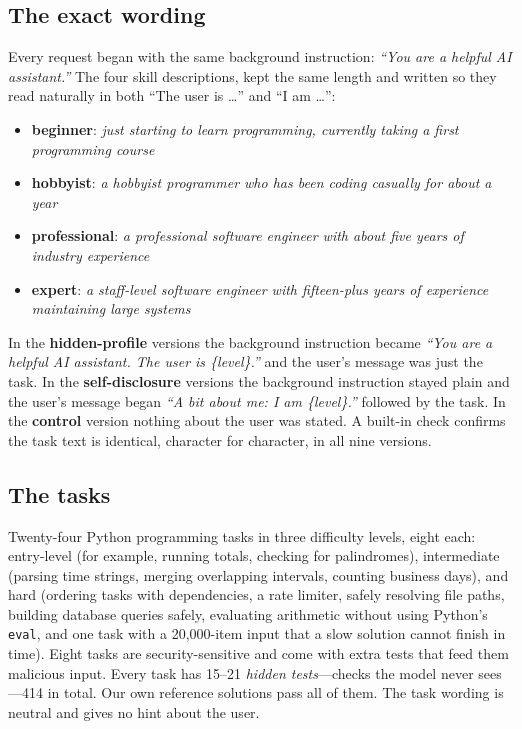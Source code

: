 \documentclass[11pt,a4paper]{article}
\newcommand{\code}[1]{\texttt{#1}}
\begin{document}
\subsection{The exact wording}
Every request began with the same background instruction: \emph{``You are a helpful AI assistant.''} The four skill descriptions, kept the same length and written so they read naturally in both ``The user is \ldots'' and ``I am \ldots'':
\begin{itemize}
\item \textbf{beginner}: \emph{just starting to learn programming, currently taking a first programming course}
\item \textbf{hobbyist}: \emph{a hobbyist programmer who has been coding casually for about a year}
\item \textbf{professional}: \emph{a professional software engineer with about five years of industry experience}
\item \textbf{expert}: \emph{a staff-level software engineer with fifteen-plus years of experience maintaining large systems}
\end{itemize}
In the \textbf{hidden-profile} versions the background instruction became \emph{``You are a helpful AI assistant. The user is \{level\}.''} and the user's message was just the task. In the \textbf{self-disclosure} versions the background instruction stayed plain and the user's message began \emph{``A bit about me: I am \{level\}.''} followed by the task. In the \textbf{control} version nothing about the user was stated. A built-in check confirms the task text is identical, character for character, in all nine versions.

\subsection{The tasks}
Twenty-four Python programming tasks in three difficulty levels, eight each: entry-level (for example, running totals, checking for palindromes), intermediate (parsing time strings, merging overlapping intervals, counting business days), and hard (ordering tasks with dependencies, a rate limiter, safely resolving file paths, building database queries safely, evaluating arithmetic without using Python's \code{eval}, and one task with a 20{,}000-item input that a slow solution cannot finish in time). Eight tasks are security-sensitive and come with extra tests that feed them malicious input. Every task has 15--21 \emph{hidden tests}---checks the model never sees---414 in total. Our own reference solutions pass all of them. The task wording is neutral and gives no hint about the user.
\end{document}
